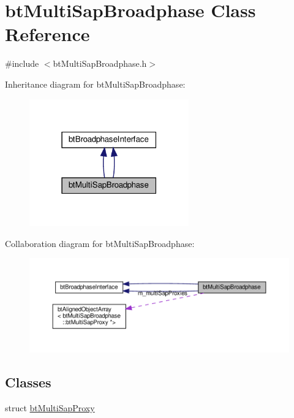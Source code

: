 \hypertarget{classbtMultiSapBroadphase}{}\section{bt\+Multi\+Sap\+Broadphase Class Reference}
\label{classbtMultiSapBroadphase}


{\ttfamily \#include $<$bt\+Multi\+Sap\+Broadphase.\+h$>$}



Inheritance diagram for bt\+Multi\+Sap\+Broadphase\+:
\nopagebreak
\begin{figure}[H]
\begin{center}
\leavevmode
\includegraphics[width=195pt]{classbtMultiSapBroadphase__inherit__graph}
\end{center}
\end{figure}


Collaboration diagram for bt\+Multi\+Sap\+Broadphase\+:
\nopagebreak
\begin{figure}[H]
\begin{center}
\leavevmode
\includegraphics[width=350pt]{classbtMultiSapBroadphase__coll__graph}
\end{center}
\end{figure}
\subsection*{Classes}
\begin{DoxyCompactItemize}
\item 
struct \hyperlink{structbtMultiSapBroadphase_1_1btMultiSapProxy}{bt\+Multi\+Sap\+Proxy}
\end{DoxyCompactItemize}
